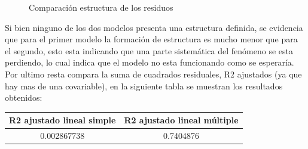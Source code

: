 \begin{figure}[h]
\centering
{}%
\hspace{0.25cm}%
\caption{Comparación estructura de los residuos}
\label{estructura_comparativa}
\end{figure}


Si bien ninguno de los dos modelos presenta una estructura definida, se evidencia que para el primer modelo la formación de estructura es mucho menor que para el segundo, esto esta indicando que una parte sistemática del fenómeno se esta perdiendo, lo cual indica que el modelo no esta funcionando como se esperaría.\\


Por ultimo resta compara la suma de cuadrados residuales, R2 ajustados (ya que hay mas de una covariable), en la siguiente tabla se muestran los resultados obtenidos:\\


\begin{center}
 \begin{tabular}{||c c||} 
 \hline
    R2 ajustado lineal simple & R2 ajustado lineal múltiple \\ 
 \hline
 0.002867738 & 0.7404876 \\
 \hline
 \hline
\end{tabular}
\end{center}

